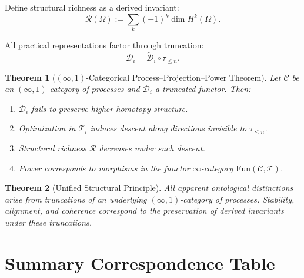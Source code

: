 \documentclass[11pt,a4paper]{article}
\newtheorem{theorem}{Theorem}[section]
\theoremstyle{definition}
\theoremstyle{remark}
\begin{document}
Define structural richness as a derived invariant:
\[
\mathcal{R}(\Omega) := \sum_k (-1)^k \dim H^k(\Omega).
\]

All practical representations factor through truncation:
\[
\mathcal{D}_i = \tilde{\mathcal{D}}_i \circ \tau_{\leq n}.
\]

\begin{theorem}[$(\infty,1)$-Categorical Process--Projection--Power Theorem]
Let $\mathcal{C}$ be an $(\infty,1)$-category of processes and $\mathcal{D}_i$ a truncated functor. Then:
\begin{enumerate}
\item $\mathcal{D}_i$ fails to preserve higher homotopy structure.
\item Optimization in $\mathcal{T}_i$ induces descent along directions invisible to $\tau_{\leq n}$.
\item Structural richness $\mathcal{R}$ decreases under such descent.
\item Power corresponds to morphisms in the functor $\infty$-category $\mathrm{Fun}(\mathcal{C}, \mathcal{T})$.
\end{enumerate}
\end{theorem}

\begin{theorem}[Unified Structural Principle]
All apparent ontological distinctions arise from truncations of an underlying $(\infty,1)$-category of processes. Stability, alignment, and coherence correspond to the preservation of derived invariants under these truncations.
\end{theorem}

\section{Summary Correspondence Table}
\end{document}
